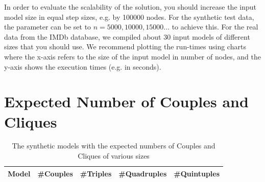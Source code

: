 \documentclass[a4paper,11pt]{article}
\begin{document}

In order to evaluate the scalability of the solution, you should
increase the input model size in equal step sizes, e.g. by 
100000 nodes. For the synthetic test data, the parameter can be
set to $n=5000, 10000, 15000\ldots$ to achieve this. For the
real data from the IMDb database, we compiled about 30 input 
models of different sizes that you should use.
We recommend plotting the run-times using charts where
the x-axis refers to the size of the input model in number of nodes,
and the y-axis shows the execution times (e.g. in seconds).





\appendix



\section{Expected Number of Couples and Cliques}
\label{sec:expected-numbers}

\begin{table}[h!]
  \centering
  \begin{tabular}{| l | r | r | r | r |}
  \hline
  \textbf{Model} & \textbf{\#Couples} & \textbf{\#Triples} & \textbf{\#Quadruples} & \textbf{\#Quintuples}\\
  \hline
  \hline
\end{tabular}
\caption{The synthetic models with the expected numbers of Couples and Cliques of various sizes}
\label{tab:synthetic-numbers}
\end{table}
\end{document}
